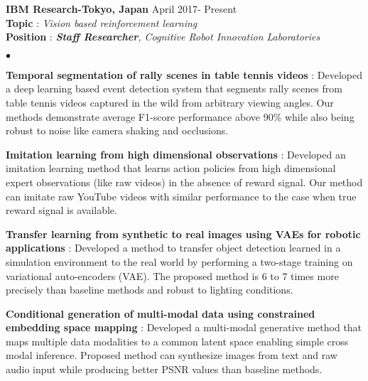\documentclass[margin,line]{res}
\newenvironment{list2}{
  \begin{list}{$\bullet$}{%
      \setlength{\itemsep}{0in}
      \setlength{\parsep}{0in} \setlength{\parskip}{0in}
      \setlength{\topsep}{0in} \setlength{\partopsep}{0in} 
      \setlength{\leftmargin}{0.2in}}}{\end{list}}
\begin{document}
\begin{resume}
\textbf{IBM Research-Tokyo, Japan} \hfill April 2017- Present  \\
\textbf{Topic} : \textit{Vision based reinforcement learning}\\
\textbf{Position} : \textit{\textbf{Staff Researcher}, Cognitive Robot Innovation Laboratories}\\

    \begin{list2}
  \item \textbf{Temporal segmentation of rally scenes in table tennis videos} : %
  Developed a deep learning based event detection system that segments rally scenes from table tennis videos captured in the wild from arbitrary viewing angles. Our methods demonstrate average F1-score performance above 90\% while also being robust to noise like camera shaking and occlusions.\\

  \item \textbf{Imitation learning from high dimensional observations} : %
  Developed an imitation learning method that learns action policies from high dimensional expert observations (like raw videos) in the absence of reward signal. Our method can imitate raw YouTube videos with similar performance to the case when true reward signal is available.\\

  	\item \textbf{Transfer learning from synthetic to real images using VAEs for robotic applications} :  %
  	Developed a method to transfer object detection learned in a simulation environment to the real world by performing a two-stage training on variational auto-encoders (VAE). The proposed method is 6 to 7 times more precisely than baseline methods and robust to lighting conditions.\\

  	\item \textbf{Conditional generation of multi-modal data using constrained embedding space mapping} : %
  	Developed a multi-modal generative method that maps multiple data modalities to a common latent space enabling simple cross modal inference. Proposed method can synthesize images from text and raw audio input while producing better PSNR values than baseline methods.\\
  	

\end{list2}
\end{resume}
\end{document}
